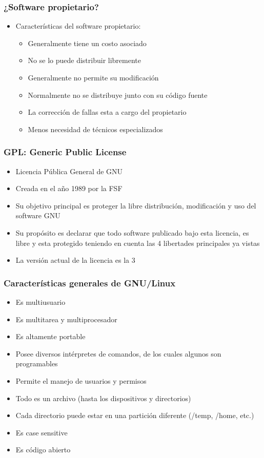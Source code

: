 \begin{frame}
	\frametitle{¿Software propietario?}
	\begin{itemize}
		\item Características del software propietario:
		\begin{itemize}
			\item Generalmente tiene un costo asociado
			\item No se lo puede distribuir libremente
			\item Generalmente no permite su modificación
			\item Normalmente no se distribuye junto con su código fuente
			\item La corrección de fallas esta a cargo del propietario
			\item Menos necesidad de técnicos especializados
		\end{itemize}
	\end{itemize}
\end{frame}

\begin{frame}
	\frametitle{GPL: Generic Public License}
	\begin{itemize}
		\item Licencia Pública General de GNU
		\item Creada en el año 1989 por la FSF
		\item Su objetivo principal es proteger la libre distribución, modificación y uso del software GNU
		\item Su propósito es declarar que todo software publicado bajo esta licencia, es libre y esta protegido teniendo en cuenta las 4 libertades principales ya vistas
		\item La versión actual de la licencia es la 3
	\end{itemize}
\end{frame}

\begin{frame}
	\frametitle{Características generales de GNU/Linux}
	\begin{itemize}
		\item Es multiusuario
		\item Es multitarea y multiprocesador
		\item Es altamente portable
		\item Posee diversos intérpretes de comandos, de los cuales algunos son programables
		\item Permite el manejo de usuarios y permisos
		\item Todo es un archivo (hasta los dispositivos y directorios)
		\item Cada directorio puede estar en una partición diferente (/temp, /home, etc.)		
		\item Es case sensitive
		\item Es código abierto
	\end{itemize}
\end{frame}

